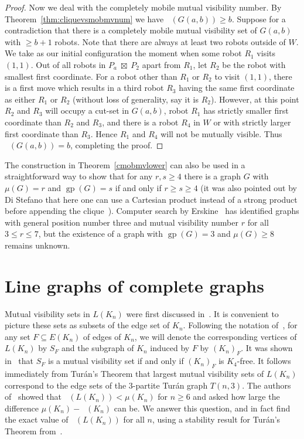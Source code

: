 \documentclass[a4paper,12pt]{article}
\DeclareMathOperator{\strongprod}{\,\boxtimes\,}
\DeclareMathOperator{\mobmv}{Mob_{\mu}}
\DeclareMathOperator{\cmobmv}{Mob^*_{\mu}}
\DeclareMathOperator{\gp}{gp}
\theoremstyle{definition}
\begin{document}
\begin{proof}
		Now we deal with the completely mobile mutual visibility number. By Theorem~\ref{thm:cliquevsmobmvnum} we have $\cmobmv (G(a,b)) \geq b$. Suppose for a contradiction that there is a completely mobile mutual visibility set of $G(a,b)$ with $\geq b+1$ robots. Note that there are always at least two robots outside of $W$. We take as our initial configuration the moment when some robot $R_1$ visits $(1,1)$. Out of all robots in $P_a \strongprod P_2$ apart from $R_1$, let $R_2$ be the robot with smallest first coordinate. For a robot other than $R_1$ or $R_2$ to visit $(1,1)$, there is a first move which results in a third robot $R_3$ having the same first coordinate as either $R_1$ or $R_2$ (without loss of generality, say it is $R_2$). However, at this point $R_2$ and $R_3$ will occupy a cut-set in $G(a,b)$, robot $R_1$ has strictly smaller first coordinate than $R_2$ and $R_3$, and there is a robot $R_4$ in $W$ or with strictly larger first coordinate than $R_3$. Hence $R_1$ and $R_4$ will not be mutually visible. Thus $\cmobmv (G(a,b)) = b$, completing the proof.
	\end{proof}
	The construction in Theorem~\ref{cmobmvlower} can also be used in a straightforward way to show that for any $r,s \geq 4$ there is a graph $G$ with $\mu (G) = r$ and $\gp (G) = s$ if and only if $r \geq s \geq 4$ (it was also pointed out by Di Stefano that here one can use a Cartesian product instead of a strong product before appending the clique~\cite{DiStefanocomment}). Computer search by Erskine~\cite{Erskine} has identified graphs with general position number three and mutual visibility number $r$ for all $3 \leq r \leq 7$, but the existence of a graph with $\gp (G) = 3$ and $\mu (G) \geq 8$ remains unknown. 
	
	\section{Line graphs of complete graphs}\label{sec:line graph complete graph}
	
	Mutual visibility sets in $L(K_n)$ were first discussed in~\cite{cicerone-2024}. It is convenient to picture these sets as subsets of the edge set of $K_n$. Following the notation of~\cite{cicerone-2024}, for any set $F \subseteq E(K_n)$ of edges of $K_n$, we will denote the corresponding vertices of $L(K_n)$ by $S_F$ and the subgraph of $K_n$ induced by $F$ by $(K_n)_F$. It was shown in~\cite{cicerone-2024} that $S_F$ is a mutual visibility set if and only if $(K_n)_F$ is $K_4$-free. It follows immediately from Tur\'{a}n's Theorem that largest mutual visibility sets of $L(K_n)$ correspond to the edge sets of the $3$-partite Tur\'{a}n graph $T(n,3)$. The authors of~\cite{dettlaff2024} showed that $\mobmv (L(K_n)) < \mu (K_n)$ for $n \geq 6$ and asked how large the difference $\mu (K_n)-\mobmv (K_n)$ can be. We answer this question, and in fact find the exact value of $\mobmv (L(K_n))$ for all $n$, using a stability result for Tur\'{a}n's Theorem from~\cite{amin-2013}.
	
\end{document}
